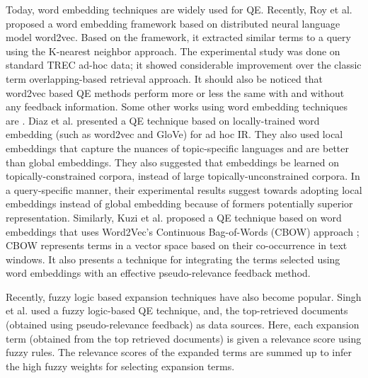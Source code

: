 Today, word embedding techniques are widely used for QE. Recently, Roy et al. \cite{roy2016using} proposed a word embedding framework based on distributed neural language model word2vec. Based on the framework, it extracted similar terms to a query using the K-nearest neighbor approach. The experimental study was done on standard TREC ad-hoc data; it showed considerable improvement over the classic term overlapping-based retrieval approach. It should also be noticed that word2vec based QE methods perform more or less the same with and without any feedback information. Some other works using word embedding techniques are \cite{diaz2016query,kuzi2016query}. Diaz et al. \cite{diaz2016query} presented a QE technique based on locally-trained word embedding (such as word2vec and GloVe) for ad hoc IR. They also used local embeddings that capture the nuances of topic-specific languages and are better than global embeddings. They also suggested that embeddings be learned on topically-constrained corpora, instead of large topically-unconstrained corpora. In a query-specific manner, their experimental results suggest towards adopting local embeddings instead of global embedding because of formers potentially superior representation. Similarly, Kuzi et al. \cite{kuzi2016query} proposed a QE technique based on word embeddings that uses Word2Vec’s Continuous Bag-of-Words (CBOW) approach \cite{mikolov2013efficient}; CBOW represents terms in a vector space based on their co-occurrence in text windows. It also presents a technique for integrating the terms selected using word embeddings with an effective pseudo-relevance feedback method.

Recently, fuzzy logic based expansion techniques have also become popular. Singh et al. \cite{singh2016new,singh2016novel} used a fuzzy logic-based QE technique, and, the top-retrieved documents (obtained using pseudo-relevance feedback) as data sources. Here, each expansion term (obtained from the top retrieved documents) is given a  relevance score using fuzzy rules. The relevance scores of the expanded terms are summed up to infer the high fuzzy weights for selecting expansion terms. 

